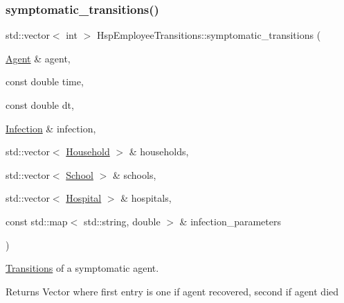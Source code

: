 \subsubsection{\texorpdfstring{symptomatic\+\_\+transitions()}{symptomatic\_transitions()}}
{\footnotesize\ttfamily std\+::vector$<$ int $>$ Hsp\+Employee\+Transitions\+::symptomatic\+\_\+transitions (\begin{DoxyParamCaption}\item[{\hyperlink{classAgent}{Agent} \&}]{agent,  }\item[{const double}]{time,  }\item[{const double}]{dt,  }\item[{\hyperlink{classInfection}{Infection} \&}]{infection,  }\item[{std\+::vector$<$ \hyperlink{classHousehold}{Household} $>$ \&}]{households,  }\item[{std\+::vector$<$ \hyperlink{classSchool}{School} $>$ \&}]{schools,  }\item[{std\+::vector$<$ \hyperlink{classHospital}{Hospital} $>$ \&}]{hospitals,  }\item[{const std\+::map$<$ std\+::string, double $>$ \&}]{infection\+\_\+parameters }\end{DoxyParamCaption})}



\hyperlink{classTransitions}{Transitions} of a symptomatic agent. 

\begin{DoxyReturn}{Returns}
Vector where first entry is one if agent recovered, second if agent died 
\end{DoxyReturn}
\mbox{\label{classHspEmployeeTransitions_a6312d9d477fcd78d5b38a654c59a473e}} 
